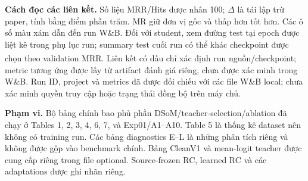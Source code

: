 \noindent\textbf{Cách đọc các liên kết.}
Số liệu MRR/Hits được nhân 100; $\Delta$ là tái lập trừ paper, tính bằng điểm phần trăm.
MR giữ đơn vị gốc và thấp hơn tốt hơn. Các ô số màu xám dẫn đến run W\&B.
Đối với student, xem đường test tại epoch được liệt kê trong phụ lục run;
summary test cuối run có thể khác checkpoint được chọn theo validation MRR.
Liên kết có dấu \textsuperscript{\textdagger} chỉ xác định run nguồn/checkpoint;
metric tương ứng được lấy từ artifact đánh giá riêng, chưa được xác minh trong W\&B.
Run ID, project và metrics đã được đối chiếu với các file W\&B local;
chưa xác minh quyền truy cập hoặc trạng thái đồng bộ trên máy chủ.

\medskip
\noindent\textbf{Phạm vi.}
Bộ bảng chính bao phủ phần DSoM/teacher-selection/ablation đã chạy ở Tables 1, 2, 3, 4, 6, 7,
và Exp01/A1--A10. Table 5 là thống kê dataset nên không có training run.
Các bảng diagnostics E--L là những phân tích riêng và không được gộp vào benchmark chính.
Bảng CleanV1 và mean-logit teacher được cung cấp riêng trong file optional.
Source-frozen RC, learned RC và các adaptations được ghi nhãn riêng.
